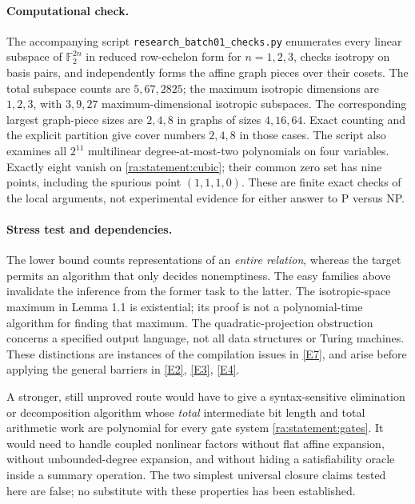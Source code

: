 \documentclass[11pt]{article}
\newcommand{\F}{\mathbb{F}}
\newcommand{\eref}[2]{\hyperlink{extra:#1:#2}{[E#2]}}
\begin{document}
\paragraph{Computational check.}
The accompanying script \texttt{research\_batch01\_checks.py} enumerates every
linear subspace of $\F_2^{2n}$ in reduced row-echelon form for $n=1,2,3$,
checks isotropy on basis pairs, and independently forms the affine graph
pieces over their cosets. The total subspace counts are $5,67,2825$; the
maximum isotropic dimensions are $1,2,3$, with $3,9,27$ maximum-dimensional
isotropic subspaces. The corresponding largest graph-piece sizes are $2,4,8$
in graphs of sizes $4,16,64$. Exact counting and the explicit partition give
cover numbers $2,4,8$ in those cases. The script also examines all $2^{11}$
multilinear degree-at-most-two polynomials on four variables. Exactly eight
vanish on \eqref{ra:statement:cubic}; their common zero set has nine points, including
the spurious point $(1,1,1,0)$. These are finite exact checks of the local
arguments, not experimental evidence for either answer to P versus NP.

\paragraph{Stress test and dependencies.}
The lower bound counts representations of an \emph{entire relation}, whereas
the target permits an algorithm that only decides nonemptiness. The easy
families above invalidate the inference from the former task to the latter.
The isotropic-space maximum in Lemma 1.1 is existential; its proof is not a
polynomial-time algorithm for finding that maximum. The quadratic-projection
obstruction concerns a specified output language, not all data structures or
Turing machines. These distinctions are instances of the compilation issues
in \eref{statement}{7}, and arise before applying the general barriers in
\eref{statement}{2}, \eref{statement}{3}, \eref{statement}{4}.

A stronger, still unproved route would have to give a syntax-sensitive
elimination or decomposition algorithm whose \emph{total} intermediate bit
length and total arithmetic work are polynomial for every gate system
\eqref{ra:statement:gates}. It would need to handle coupled nonlinear factors without
flat affine expansion, without unbounded-degree expansion, and without
hiding a satisfiability oracle inside a summary operation. The two simplest
universal closure claims tested here are false; no substitute with these
properties has been established.
\end{document}
